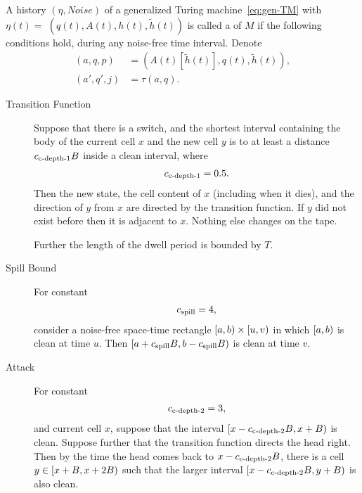 \documentclass[12pt]{memoir}
\def\B{B}
\newcommand{\h}{h}
\newcommand{\hc}{\tilde h}
\newcommand{\Noise}{\mathit{Noise}}
\newcommand{\Tu}{T}
\newcommand{\cns}[1]{c_{\textrm{\upshape #1}}}
\newcommand{\cCDepth}[1]{\cns{c-depth-#1}}
\newcommand{\cSpill}{\cns{spill}}
\begin{document}
\begin{definition}[Trajectory]\label{def:traj}
\begin{sloppypar}
   A history  \( (\eta, \Noise) \) of a generalized Turing 
machine~\eqref{eq:gen-TM} with \(\eta(t) =\)
\( (q(t), A(t), \h(t), \hc(t)) \)
is called a  of \( M \) if the following conditions hold, during any 
noise-free time interval.
Denote 
\begin{align*}
     (a, q, p) &= (A(t)[\hc(t)], q(t),\hc(t)),
\\ (a',q',j)   &= \tau(a,q).
 \end{align*}
  \end{sloppypar}
\begin{description}

\item[Transition Function]\label{i:def.traj.transition}
Suppose that there is a switch, and the shortest interval
containing the body of the current cell \( x \) and the
new cell \( y \) is to at least a distance \( \cCDepth1 \B \) inside
a clean interval, where
 \begin{align}\label{eq:cns.clean-depth-1}
  \cCDepth1 =0.5.
 \end{align}
Then the new state, the cell content of \( x \) (including when it dies), and
the direction of \( y \) from \( x \) are directed by the transition function.
If \( y \) did not exist before then it is adjacent to \( x \).
Nothing else changes on the tape.

Further the length of the dwell period is bounded by \( \Tu \).


\item[Spill Bound]\label{i:spill-bound}
For constant
\begin{align}\label{eq:cns.spill}
   \cSpill =4,
 \end{align}
consider a noise-free space-time rectangle 
\( \left[a,b\right)\times \left[u,v\right) \) in which \( \left[a,b\right) \) is
clean at time \( u \).
Then \( \lint{a+\cSpill\B}{b-\cSpill\B} \) is clean at time \( v \).

\item[Attack] \label{i:def.traj.attack-from-outside}
For constant
\begin{align}\label{eq:cns.clean-depth-2}
   \cCDepth2 =3,
 \end{align}
and current cell \( x \), suppose that the interval
\( \lint{x-\cCDepth2\B}{x+\B} \) is clean.
Suppose further that the transition function directs the head right.
Then by the time the head comes back to \( x-\cCDepth2 \B \), there is a cell
\( y\in \lint{x+\B}{x+2\B} \) such that the larger interval 
\( \lint{x-\cCDepth2\B}{y+\B} \) is also clean.


\end{description}
\end{definition}
\end{document}
